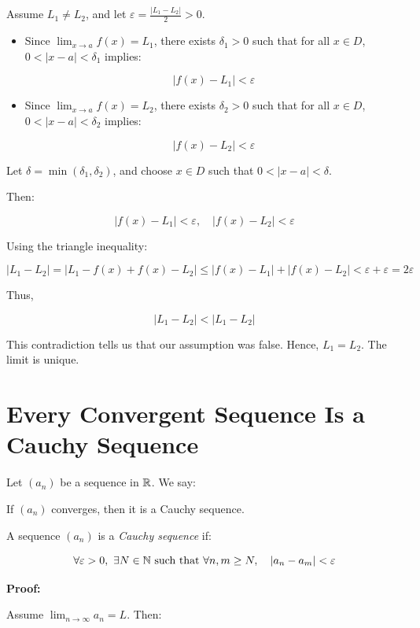 Assume \( L_1 \ne L_2 \), and let \( \varepsilon = \frac{|L_1 - L_2|}{2} > 0 \).

\begin{itemize}

    \item Since \( \lim_{x \to a} f(x) = L_1 \), there exists \( \delta_1 > 0 \) such that for all \( x \in D \), \( 0 < |x - a| < \delta_1 \) implies:

    \[
        |f(x) - L_1| < \varepsilon
    \]
    
    \item Since \( \lim_{x \to a} f(x) = L_2 \), there exists \( \delta_2 > 0 \) such that for all \( x \in D \), \( 0 < |x - a| < \delta_2 \) implies:

    \[
        |f(x) - L_2| < \varepsilon
    \]

\end{itemize}

Let \( \delta = \min(\delta_1, \delta_2) \), and choose \( x \in D \) such that \( 0 < |x - a| < \delta \).

Then:

\[
    |f(x) - L_1| < \varepsilon, \quad |f(x) - L_2| < \varepsilon
\]

Using the triangle inequality:

\[
    |L_1 - L_2| = |L_1 - f(x) + f(x) - L_2| \le |f(x) - L_1| + |f(x) - L_2| < \varepsilon + \varepsilon = 2\varepsilon
\]

Thus, 

\[
    |L_1 - L_2|  <  |L_1 - L_2|
\]


This contradiction tells us that our assumption was false. Hence, \( L_1 = L_2 \). The limit is unique.

\QED

\section{Every Convergent Sequence Is a Cauchy Sequence}

Let \( (a_n) \) be a sequence in \( \mathbb{R} \). We say:

If \( (a_n) \) converges, then it is a Cauchy sequence.

A sequence \( (a_n) \) is a \emph{Cauchy sequence} if:

\[
    \forall \varepsilon > 0, \ \exists N \in \mathbb{N} \text{ such that } \forall n, m \ge N, \quad |a_n - a_m| < \varepsilon
\]

\textbf{Proof:}

Assume \( \lim_{n \to \infty} a_n = L \). Then:


